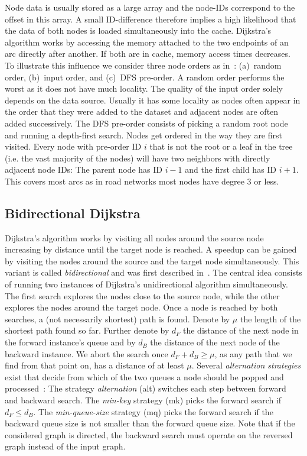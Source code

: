 \documentclass{sig-alternate}
\begin{document}
Node data is usually stored as a large array and the node-IDs correspond
to the offset in this array. A small ID-difference therefore implies
a high likelihood that the data of both nodes is loaded simultaneously into the cache. Dijkstra's
algorithm works by accessing the memory attached to the two endpoints
of an arc directly after another. If both are in cache, memory access times decreases. To illustrate this influence
we consider three node orders as in~\cite{dgnw-phast-13}: (a)~random order, (b)~input order, and
(c)~DFS pre-order. A random order performs the worst as it does not have much locality. The quality of the input order solely depends
on the data source. Usually it has some locality as nodes often appear
in the order that they were added to the dataset and adjacent nodes
are often added successively. The DFS pre-order consists of picking
a random root node and running a depth-first search. Nodes get ordered
in the way they are first visited. Every node with pre-order ID $i$
that is not the root or a leaf in the tree (i.e. the vast majority
of the nodes) will have two neighbors with directly adjacent node
IDs: The parent node has ID $i-1$ and the first child has ID $i+1$.
This covers most arcs as in road networks most nodes have degree 3 or less.




\subsection{Bidirectional Dijkstra}

Dijkstra's algorithm works by visiting all nodes around the source
node increasing by distance until the target node is reached. A speedup
can be gained by visiting the nodes around the source and the target
node simultaneously. This variant is called \emph{bidirectional} and
was first described in~\cite{d-lpe-62}. The central idea consists
of running two instances of Dijkstra's unidirectional algorithm simultaneously.
The first search explores the nodes close to the source node, while
the other explores the nodes around the target node. Once a node is
reached by both searches, a (not necessarily shortest) path is found.
Denote by $\mu$ the length of the shortest path found so far. Further
denote by $d_{F}$ the distance of the next node in the forward instance's
queue and by $d_{B}$ the distance of the next node of the backward
instance. We abort the search once $d_{F}+d_{B}\ge\mu$, as any path
that we find from that point on, has a distance of at least
$\mu$. Several \emph{alternation strategies} exist that decide from
which of the two queues a node should be popped and processed~\cite{p-bs-71,ww-sutsp-07}:
The strategy \emph{alternation} (alt) switches each step between forward
and backward search. The \emph{min-key} strategy (mk) picks the forward
search if $d_{F}\le d_{B}$. The \emph{min-queue-size} strategy (mq)
picks the forward search if the backward queue size is not smaller
than the forward queue size. 
Note that if the considered graph is directed, the backward search must operate on the reversed graph instead of the input graph. 
\end{document}
